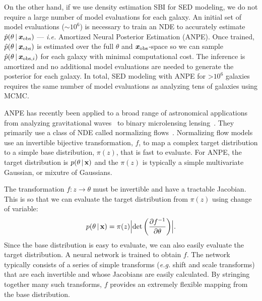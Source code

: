 On the other hand, if we use density estimation SBI for SED modeling, we do not
require a large number of model evaluations for each galaxy. 
An initial set of model evaluations (${\sim}10^6$) is necessary to train an NDE
to accurately estimate $\hat{p}(\theta \,|\, \textbf{\textit{x}}_{\rm obs})$ --- \emph{i.e.} Amortized
Neural Posterior Estimation (ANPE).
Once trained, $\hat{p}(\theta \,|\, \textbf{\textit{x}}_{\rm obs})$ is estimated over the full
$\theta$ and $\textbf{\textit{x}}_{\rm obs}$-space so we can sample $\hat{p}(\theta\,|\,\textbf{\textit{x}}_{{\rm
obs}, i})$ for each galaxy with minimal computational cost. 
The inference is amortized and no additional model evaluations are
needed to generate the posterior for each galaxy. 
In total, SED modeling with ANPE for >$10^6$ galaxies requires the same number
of model evaluations as analyzing tens of galaxies using MCMC. 

ANPE has recently been applied to a broad range of astronomical applications
from analyzing gravitational waves~\citep[\emph{e.g.}][]{wong2020,dax2021} to
binary microlensing lensing~\citep{zhang2021}.
They primarily use a class of NDE called normalizing flows~\citep{tabak2010,
tabak2013}.
Normalizing flow models use an invertible bijective transformation, $f$, to map
a complex target distribution to a simple base distribution, $\pi(z)$, that is
fast to evaluate.
For ANPE, the target distribution is $p(\theta \,|\, {\bf x})$ and the
$\pi(z)$ is typically a simple multivariate Gaussian, or mixutre of Gaussians.

The transformation $f: z \rightarrow \theta$ must be invertible and have a
tractable Jacobian. 
This is so that we can evaluate the target distribution from $\pi(z)$ using
change of variable:  
\begin{equation}
    p(\theta \given {\bf x}) = \pi(z) \Bigl|{\rm det} \left(\frac{\partial
    f^{-1}}{\partial \theta} \right)\Bigr|.
\end{equation} 
Since the base distribution is easy to evaluate, we can also easily evaluate
the target distribution.  
A neural network is trained to obtain $f$.
The network typically consists of a series of simple transforms (\emph{e.g.}
shift and scale transforms) that are each invertible and whose Jacobians are
easily calculated. 
By stringing together many such transforms, $f$ provides an extremely flexible
mapping from the base distribution.


